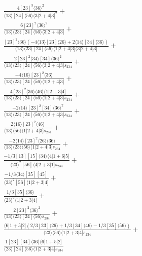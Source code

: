 \documentclass[varwidth, border=5pt]{standalone}
\begin{document}
\begin{my}
$\begin{gathered}
\scriptscriptstyle\frac{4[23]^3⟨36⟩^2}{⟨13⟩[24]⟨56⟩⟨3|2+4|3]^2}+\\
\scriptscriptstyle\frac{6[23]^2⟨36⟩^2}{⟨13⟩⟨23⟩[24]⟨56⟩⟨3|2+4|3]}+\\
\scriptscriptstyle\frac{[23]^2⟨36⟩(-4⟨13⟩[23]⟨26⟩+2⟨14⟩[34]⟨36⟩)}{⟨13⟩⟨23⟩[24]⟨56⟩⟨1|2+4|3]⟨3|2+4|3]}+\\
\scriptscriptstyle\frac{2[23]^2⟨34⟩[34]⟨36⟩^2}{⟨13⟩⟨23⟩[24]⟨56⟩⟨3|2+4|3]s_{234}}+\\
\scriptscriptstyle\frac{-4⟨16⟩[23]^2⟨36⟩}{⟨13⟩⟨23⟩[24]⟨56⟩⟨1|2+4|3]}+\\
\scriptscriptstyle\frac{4[23]^2⟨36⟩⟨46⟩⟨1|2+3|4]}{⟨13⟩⟨23⟩[24]⟨56⟩⟨1|2+4|3]s_{234}}+\\
\scriptscriptstyle\frac{-2⟨14⟩[23]^2[34]⟨36⟩^2}{⟨13⟩⟨23⟩[24]⟨56⟩⟨1|2+4|3]s_{234}}+\\
\scriptscriptstyle\frac{2⟨16⟩[23]^2⟨46⟩}{⟨13⟩⟨56⟩⟨1|2+4|3]s_{234}}+\\
\scriptscriptstyle\frac{-2⟨14⟩[23]^2⟨26⟩⟨36⟩}{⟨13⟩⟨23⟩⟨56⟩⟨1|2+4|3]s_{234}}+\\
\scriptscriptstyle\frac{-1/3[13][15]⟨34⟩⟨4|1+6|5]}{⟨23⟩^2[56]⟨4|2+3|1]s_{234}}+\\
\scriptscriptstyle\frac{-1/3⟨34⟩[35][45]}{⟨23⟩^2[56]⟨1|2+3|4]}+\\
\scriptscriptstyle\frac{1/3[35]⟨36⟩}{⟨23⟩^2⟨1|2+3|4]}+\\
\scriptscriptstyle\frac{2[23]^2⟨36⟩^2}{⟨13⟩⟨23⟩[24]⟨56⟩s_{234}}+\\
\scriptscriptstyle\frac{⟨6|1+5|2](2/3[23]⟨26⟩+1/3[34]⟨46⟩-1/3[35]⟨56⟩)}{⟨23⟩⟨56⟩⟨1|2+3|4]s_{234}}+\\
\scriptscriptstyle\frac{1[23][34]⟨36⟩⟨6|1+5|2]}{⟨23⟩[24]⟨56⟩⟨1|2+3|4]s_{234}}\phantom{+}
\end{gathered}$
\end{my}
\end{document}
